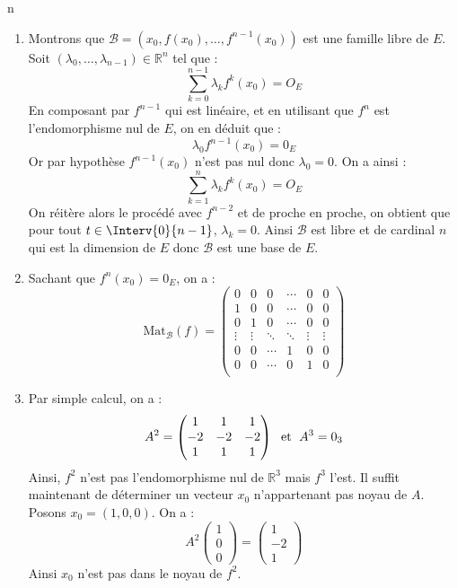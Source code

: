 n\documentclass[a4paper,10pt]{report}
\begin{document}
\begin{enumerate}
\item Montrons que $\mathcal{B}= (x_0, f(x_0), \ldots, f^{n-1}(x_0))$ est une famille libre de $E$. Soit $(\lambda_0, \ldots, \lambda_{n-1}) \in \mathbb{R}^n$ tel que :
$$ \sum_{k=0}^{n-1} \lambda_k f^k (x_0) = O_E$$
En composant par $f^{n-1}$ qui est linéaire, et en utilisant que $f^n$ est l'endomorphisme nul de $E$, on en déduit que :
$$ \lambda_0 f^{n-1}(x_0)=0_E$$
Or par hypothèse $f^{n-1}(x_0)$ n'est pas nul donc $\lambda_0=0$. On a ainsi :
$$ \sum_{k=1}^n \lambda_k f^k (x_0) = O_E$$
On réitère alors le procédé avec $f^{n-2}$ et de proche en proche, on obtient que pour tout $t \in \Interv{0}{n-1}$, $\lambda_k=0$. Ainsi $\mathcal{B}$ est libre et de cardinal $n$ qui est la dimension de $E$ donc $\mathcal{B}$ est une base de $E$.
\item Sachant que $f^n(x_0)=0_E$, on a :
$$ \textrm{Mat}_{\mathcal{B}}(f) = \begin{pmatrix}
0 & 0 & 0 & \cdots & 0 & 0 \\
1 & 0 & 0 & \cdots & 0 & 0 \\
0 & 1 & 0 & \cdots & 0& 0 \\
\vdots & \vdots& \ddots    & \ddots &  \vdots & \vdots \\
0 & 0 & \cdots & 1 &0 & 0\\
0 & 0 & \cdots & 0 & 1 & 0 \\
\end{pmatrix}$$

\item Par simple calcul, on a :
$$ A^2  = \begin{pmatrix}
1 & 1 & 1 \\
-2 & -2& -2 \\
1 & 1 & 1 
\end{pmatrix} \; \hbox{ et } \; A^3 = 0_3$$
Ainsi, $f^2$ n'est pas l'endomorphisme nul de $\mathbb{R}^3$ mais $f^3$ l'est. Il suffit maintenant de déterminer un vecteur $x_0$ n'appartenant pas noyau de $A$. Posons $x_0= (1,0,0)$. On a :
$$ A^2 \begin{pmatrix}
1 \\
0\\
0
\end{pmatrix} = \begin{pmatrix}
1 \\
-2 \\
1
\end{pmatrix}$$
Ainsi $x_0$ n'est pas dans le noyau de $f^2$.
\end{enumerate}
\end{document}
